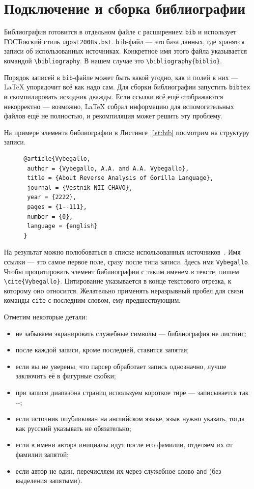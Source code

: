 \documentclass[14pt,russian]{scrartcl}
\begin{document}
\section{Подключение и сборка библиографии}

Библиография готовится в отдельном файле с расширением \texttt{bib} и использует ГОСТовский стиль \texttt{ugost2008s.bst}. \texttt{bib}-файл --- это база данных, где хранятся записи об использованных источниках. Конкретное имя этого файла указывается командой \texttt{\textbackslash bibliography}. В нашем случае это \texttt{\textbackslash bibliography\{biblio\}}.

Порядок записей в \texttt{bib}-файле может быть какой угодно, как и полей в них --- \LaTeX{} упорядочит всё как надо сам. Для сборки библиографии запустить \texttt{bibtex} и скомпилировать исходник дважды. Если ссылки всё ещё отображаются некорректно --- возможно, \LaTeX{} собрал информацию для вспомогательных файлов ещё не полностью, и рекомпиляция может решить эту проблему.

На примере элемента библиографии в Листинге~\ref{lst:bib} посмотрим на структуру записи. 

\begin{figure}[!htb]
\begin{lstlisting}[language={TeX},caption={Пример элемента библиографии},label={lst:bib}]
@article{Vybegallo,
 author = {Vybegallo, A.A. and A.A. Vybegallo},
 title = {About Reverse Analysis of Gorilla Language},
 journal = {Vestnik NII CHAVO},
 year = {2222},
 pages = {1--111},
 number = {0},
 language = {english}
}
\end{lstlisting}
\end{figure}

На результат можно полюбоваться в списке использованных источников~\cite{Vybegallo}. Имя ссылки --- это самое первое поле, сразу после типа записи. Здесь имя \texttt{Vybegallo}. Чтобы процитировать элемент библиографии с таким именем в тексте, пишем \texttt{\textbackslash cite\{Vybegallo\}}. Цитирование указывается в конце текстового отрезка, к которому оно относится. Желательно применять неразрывный пробел для связи команды \texttt{cite} с последним словом, ему предшествующим.

Отметим некоторые детали:
\begin{itemize}
\item не забываем экранировать служебные символы --- библиография не листинг;
\item после каждой записи, кроме последней, ставится запятая;
\item если вы не уверены, что парсер обработает запись однозначно, лучше заключить её в фигурные скобки;
\item при записи диапазона страниц используем короткое тире --- записывается так -{}-;
\item если источник опубликован на английском языке, язык нужно указать, тогда как русский указывать не обязательно;
\item если в имени автора инициалы идут после его фамилии, отделяем их от фамилии запятой;
\item если автор не один, перечисляем их через служебное слово \texttt{and} (без выделения запятыми). 
\end{itemize}
\end{document}
